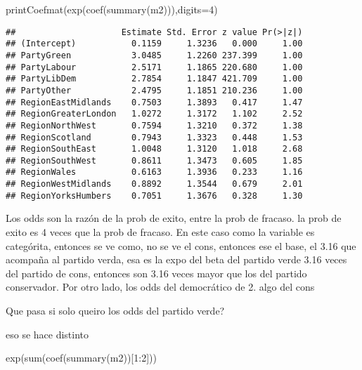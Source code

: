 \documentclass[
]{article}
\newenvironment{Shaded}{\begin{snugshade}}{\end{snugshade}}
\newcommand{\AttributeTok}[1]{\textcolor[rgb]{0.77,0.63,0.00}{#1}}
\newcommand{\DecValTok}[1]{\textcolor[rgb]{0.00,0.00,0.81}{#1}}
\newcommand{\FunctionTok}[1]{\textcolor[rgb]{0.00,0.00,0.00}{#1}}
\newcommand{\NormalTok}[1]{#1}
\newcommand{\SpecialCharTok}[1]{\textcolor[rgb]{0.00,0.00,0.00}{#1}}
\begin{document}
\begin{Shaded}
\begin{Highlighting}[]
\FunctionTok{printCoefmat}\NormalTok{(}\FunctionTok{exp}\NormalTok{(}\FunctionTok{coef}\NormalTok{(}\FunctionTok{summary}\NormalTok{(m2))),}\AttributeTok{digits=}\DecValTok{4}\NormalTok{)}
\end{Highlighting}
\end{Shaded}

\begin{verbatim}
##                     Estimate Std. Error z value Pr(>|z|)
## (Intercept)           0.1159     1.3236   0.000     1.00
## PartyGreen            3.0485     1.2260 237.399     1.00
## PartyLabour           2.5171     1.1865 220.680     1.00
## PartyLibDem           2.7854     1.1847 421.709     1.00
## PartyOther            2.4795     1.1851 210.236     1.00
## RegionEastMidlands    0.7503     1.3893   0.417     1.47
## RegionGreaterLondon   1.0272     1.3172   1.102     2.52
## RegionNorthWest       0.7594     1.3210   0.372     1.38
## RegionScotland        0.7943     1.3323   0.448     1.53
## RegionSouthEast       1.0048     1.3120   1.018     2.68
## RegionSouthWest       0.8611     1.3473   0.605     1.85
## RegionWales           0.6163     1.3936   0.233     1.16
## RegionWestMidlands    0.8892     1.3544   0.679     2.01
## RegionYorksHumbers    0.7051     1.3676   0.328     1.30
\end{verbatim}

Los odds son la razón de la prob de exito, entre la prob de fracaso. la
prob de exito es 4 veces que la prob de fracaso. En este caso como la
variable es categórita, entonces se ve como, no se ve el cons, entonces
ese el base, el 3.16 que acompaña al partido verda, esa es la expo del
beta del partido verde 3.16 veces del partido de cons, entonces son 3.16
veces mayor que los del partido conservador. Por otro lado, los odds del
democrático de 2. algo del cons

Que pasa si solo queiro los odds del partido verde?

eso se hace distinto

\begin{Shaded}
\begin{Highlighting}[]
\FunctionTok{exp}\NormalTok{(}\FunctionTok{sum}\NormalTok{(}\FunctionTok{coef}\NormalTok{(}\FunctionTok{summary}\NormalTok{(m2))[}\DecValTok{1}\SpecialCharTok{:}\DecValTok{2}\NormalTok{]))}
\end{Highlighting}
\end{Shaded}
\end{document}
